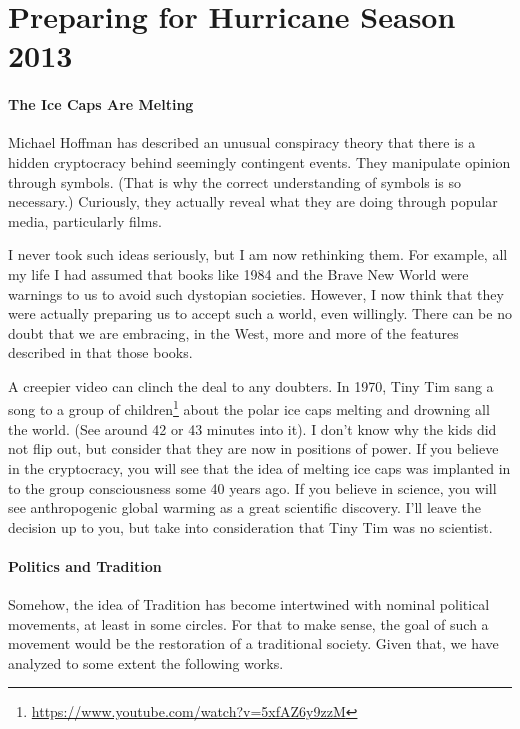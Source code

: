 \section{Preparing for Hurricane Season 2013}

\paragraph{The Ice Caps Are Melting}


Michael Hoffman has described an unusual conspiracy theory that there is a hidden cryptocracy behind seemingly contingent events. They manipulate opinion through symbols. (That is why the correct understanding of symbols is so necessary.) Curiously, they actually reveal what they are doing through popular media, particularly films.

I never took such ideas seriously, but I am now rethinking them. For example, all my life I had assumed that books like 1984 and the Brave New World were warnings to us to avoid such dystopian societies. However, I now think that they were actually preparing us to accept such a world, even willingly. There can be no doubt that we are embracing, in the West, more and more of the features described in that those books.

A creepier video can clinch the deal to any doubters. In 1970, Tiny Tim sang a song to a group of children\footnote{\url{https://www.youtube.com/watch?v=5xfAZ6y9zzM}} about the polar ice caps melting and drowning all the world. (See around 42 or 43 minutes into it). I don't know why the kids did not flip out, but consider that they are now in positions of power. If you believe in the cryptocracy, you will see that the idea of melting ice caps was implanted in to the group consciousness some 40 years ago. If you believe in science, you will see anthropogenic global warming as a great scientific discovery. I'll leave the decision up to you, but take into consideration that Tiny Tim was no scientist.

\paragraph{Politics and Tradition}


Somehow, the idea of Tradition has become intertwined with nominal political movements, at least in some circles. For that to make sense, the goal of such a movement would be the restoration of a traditional society. Given that, we have analyzed to some extent the following works.

